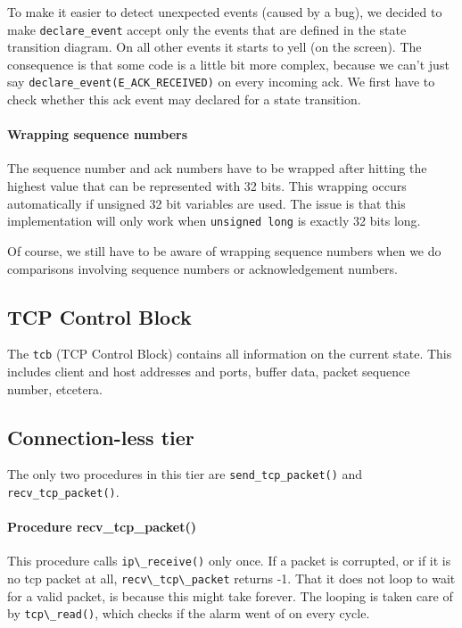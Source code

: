 \documentclass[11pt]{article}
\begin{document}
    To make it easier to detect unexpected events (caused by a bug), we decided 
    to make \lstinline|declare_event| accept only the events that are defined in the
    state transition diagram. On all other events it starts to yell (on the 
    screen). The consequence is that some code is a little bit more complex, 
    because we can't just say \lstinline|declare_event(E_ACK_RECEIVED)|
    on every incoming ack. We first have to check whether this ack event may 
    declared for a state transition.
    
    
\paragraph{Wrapping sequence numbers}
    The sequence number and ack numbers have to be wrapped after hitting the 
    highest value that can be represented with 32 bits. This wrapping occurs 
    automatically if unsigned 32 bit variables are used. The issue is that 
    this implementation will only work when \lstinline|unsigned long| is 
    exactly 32 bits long.
    
    Of course, we still have to be aware of wrapping sequence numbers when we do
    comparisons involving sequence numbers or acknowledgement numbers.



\subsection{TCP Control Block}


The \lstinline|tcb| (TCP Control Block) contains all information on the
current state. This includes client and host addresses and ports, buffer
data, packet sequence number, etcetera.


\paragraph{}


\subsection{Connection-less tier}

The only two procedures in this tier are \lstinline|send_tcp_packet()| and
\lstinline|recv_tcp_packet()|.

\paragraph{Procedure recv\_tcp\_packet()}
This procedure calls \lstinline|ip\_receive()| only once. If a packet is corrupted,
or if it is no tcp packet at all, \lstinline|recv\_tcp\_packet| returns -1.
That it does not loop to wait for a valid packet, is because this might take 
forever. The looping is taken care of by \lstinline|tcp\_read()|, which checks if the alarm 
went of on every cycle.
\end{document}
